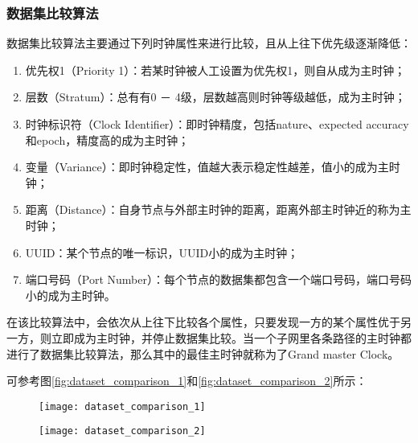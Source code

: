 \subsubsection{数据集比较算法}
数据集比较算法主要通过下列时钟属性来进行比较，且从上往下优先级逐渐降低：
\begin{enumerate}[noitemsep,topsep=0pt,parsep=0pt,partopsep=0pt]
	\item 优先权1（Priority 1）：若某时钟被人工设置为优先权1，则自从成为主时钟；
	\item 层数（Stratum）：总有有0 － 4级，层数越高则时钟等级越低，成为主时钟；
	\item 时钟标识符（Clock Identifier）：即时钟精度，包括nature、expected accuracy和epoch，精度高的成为主时钟；
	\item 变量（Variance）：即时钟稳定性，值越大表示稳定性越差，值小的成为主时钟；
	\item 距离（Distance）：自身节点与外部主时钟的距离，距离外部主时钟近的称为主时钟；
	\item UUID：某个节点的唯一标识，UUID小的成为主时钟；
	\item 端口号码（Port Number）：每个节点的数据集都包含一个端口号码，端口号码小的成为主时钟。
\end{enumerate}

在该比较算法中，会依次从上往下比较各个属性，只要发现一方的某个属性优于另一方，则立即成为主时钟，并停止数据集比较。当一个子网里各条路径的主时钟都进行了数据集比较算法，那么其中的最佳主时钟就称为了Grand master Clock。

可参考图\ref{fig:dataset_comparison_1}和\ref{fig:dataset_comparison_2}所示：

\begin{figure}[!hbp]
  \centering
  \begin{minipage}[b]{0.8\textwidth}
    \captionstyle{\centering}
    \centering
    \texttt{[image: dataset\_comparison\_1]}
  \end{minipage}     
\end{figure}

\begin{figure}[!hbp]
  \centering
  \begin{minipage}[b]{0.6\textwidth}
    \captionstyle{\centering}
    \centering
    \texttt{[image: dataset\_comparison\_2]}
  \end{minipage}     
\end{figure}

